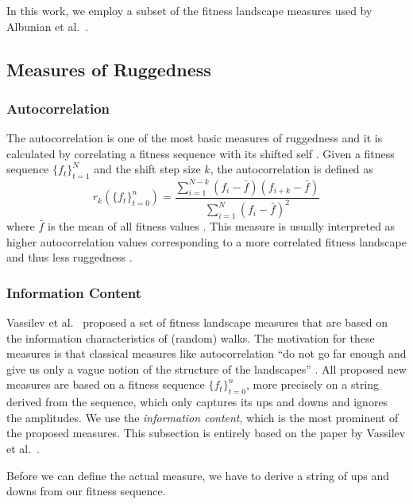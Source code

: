 \documentclass[
  a4paper,  %
  twoside,  %
  bibliography=totoc,
  headsepline,
  cleardoublepage=empty,
  parskip=half,
  draft=false
]{scrbook}
\begin{document}
In this work, we employ a subset of the fitness landscape measures used by Albunian et al.~\cite{albunian2020causes}.

\subsection{Measures of Ruggedness}

\subsubsection{Autocorrelation}

The autocorrelation is one of the most basic measures of ruggedness and it is calculated by correlating a fitness sequence with its shifted self \cite{pitzer2012comprehensive}.
Given a fitness sequence $\{f_t\}_{t = 1}^{N}$ and the shift step size $k$, the autocorrelation is defined as
\begin{equation}
	r_k(\{f_t\}_{t = 0}^{n}) = \frac{\sum_{i = 1}^{N - k} (f_i - \bar{f}) (f_{i+k} - \bar{f})}{\sum_{i = 1}^{N} (f_i - \bar{f})^2}
\end{equation}
where $\bar{f}$ is the mean of all fitness values \cite{albunian2020causes}.
This measure is usually interpreted as higher autocorrelation values corresponding to a more correlated fitness landscape and thus less ruggedness \cite{albunian2020causes}.

\subsubsection{Information Content}
Vassilev et al.~\cite{vassilev2000information} proposed a set of fitness landscape measures that are based on the information characteristics of (random) walks.
The motivation for these measures is that classical measures like autocorrelation \enquote{do not go far enough and give us only a vague notion of the structure of the landscapes} \cite{vassilev2000information}.
All proposed new measures are based on a fitness sequence $\{f_t\}_{t = 0}^{n}$, more precisely on a string derived from the sequence, which only captures its ups and downs and ignores the amplitudes. We use the \emph{information content}, which is the most prominent of the proposed measures. This subsection is entirely based on the paper by Vassilev et al.~\cite{vassilev2000information}.

Before we can define the actual measure, we have to derive a string of ups and downs from our fitness sequence.
\end{document}

